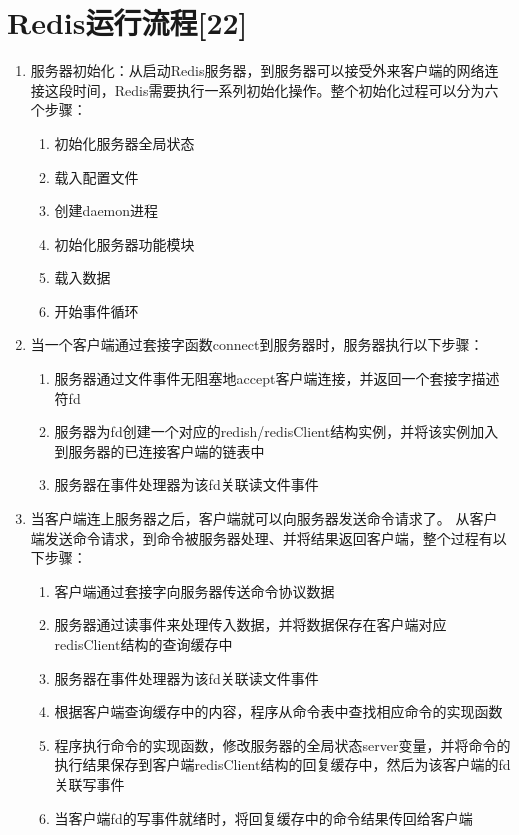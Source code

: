 \documentclass[proposal]{zjutreport}
\begin{document}
\section{Redis运行流程[22]}
\begin{enumerate}[label=\arabic*.]
\item{服务器初始化：从启动Redis服务器，到服务器可以接受外来客户端的网络连接这段时间，Redis需要执行一系列初始化操作。整个初始化过程可以分为六个步骤：
\begin{enumerate}[label=\Roman{*}.]
\item{初始化服务器全局状态}
\item{载入配置文件}
\item{创建daemon进程}
\item{初始化服务器功能模块}
\item{载入数据}
\item{开始事件循环}
\end{enumerate}
}

\item{当一个客户端通过套接字函数connect到服务器时，服务器执行以下步骤：
\begin{enumerate}[label=\Roman{*}.]
\item{服务器通过文件事件无阻塞地accept客户端连接，并返回一个套接字描述符fd}
\item{服务器为fd创建一个对应的redish/redisClient结构实例，并将该实例加入到服务器的已连接客户端的链表中}
\item{服务器在事件处理器为该fd关联读文件事件}
\end{enumerate}
}

\item{
当客户端连上服务器之后，客户端就可以向服务器发送命令请求了。
从客户端发送命令请求，到命令被服务器处理、并将结果返回客户端，整个过程有以下步骤：
\begin{enumerate}[label=\Roman{*}.]
\item{客户端通过套接字向服务器传送命令协议数据}
\item{服务器通过读事件来处理传入数据，并将数据保存在客户端对应redisClient结构的查询缓存中}
\item{服务器在事件处理器为该fd关联读文件事件}
\item{根据客户端查询缓存中的内容，程序从命令表中查找相应命令的实现函数}
\item{程序执行命令的实现函数，修改服务器的全局状态server变量，并将命令的执行结果保存到客户端redisClient结构的回复缓存中，然后为该客户端的fd关联写事件}
\item{当客户端fd的写事件就绪时，将回复缓存中的命令结果传回给客户端}
\end{enumerate}
}
\end{enumerate}
\end{document}
